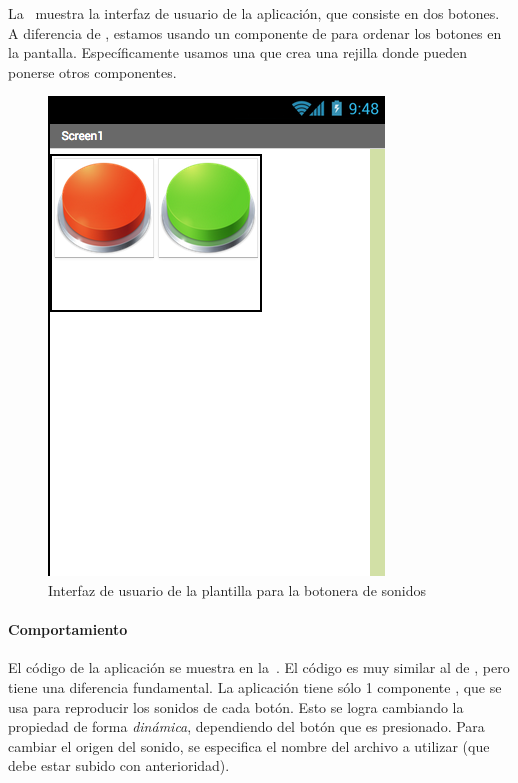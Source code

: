 \documentclass[letterpaper]{article}
\begin{document}
La~ muestra la interfaz de usuario de la
aplicación, que consiste en dos botones. A diferencia de , estamos usando un componente de 
para ordenar los botones en la pantalla. Específicamente usamos una
 que crea una rejilla donde pueden
ponerse otros componentes.

\begin{figure}[H]
\centering
\includegraphics[scale=0.25]{figures/BotoneraUI}
\caption{Interfaz de usuario de la plantilla para la botonera de sonidos}
\label{fig:botoneraUI}
\end{figure}

\paragraph{Comportamiento}

El código de la aplicación se muestra en
la~. El código es muy similar al de
, pero tiene una diferencia fundamental. La
aplicación tiene sólo 1 componente , que se usa para
reproducir los sonidos de cada botón. Esto se logra cambiando la
propiedad  de forma \emph{dinámica}, dependiendo del
botón que es presionado. Para cambiar el origen del sonido, se
especifica el nombre del archivo a utilizar (que debe estar subido con
anterioridad).
\end{document}

